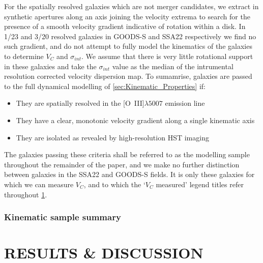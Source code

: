\documentclass[fleqn,usenatbib]{mn2e}
\begin{document}
For the spatially resolved galaxies which are not merger candidates, we extract in synthetic apertures along an axis joining the velocity extrema to search for the presence of a smooth velocity gradient indicative of rotation within a disk.
In 1/23 and 3/20 resolved galaxies in GOODS-S and SSA22 respectively we find no such gradient, and do not attempt to fully model the kinematics of the galaxies to determine $V_{C}$ and $\sigma_{int}$.
We assume that there is very little rotational support in these galaxies and take the $\sigma_{int}$ value as the median of the intrumental resolution corrected velocity dispersion map.
To sumamrise, galaxies are passed to the full dynamical modelling of \cref{sec:Kinematic_Properties} if:
\begin{itemize}
    \item They are spatially resolved in the [O~{\sc III}]$\lambda5007$ emission line
    \item They have a clear, monotonic velocity gradient along a single kinematic axis
    \item They are isolated as revealed by high-resolution HST imaging
\end{itemize}

The galaxies passing these criteria shall be referred to as the modelling sample throughout the remainder of the paper, and we make no further distinction between galaxies in the SSA22 and GOODS-S fields.
It is only these galaxies for which we can measure $V_{C}$, and to which the `$V_{C}$ measured' legend titles refer throughout \ref{sec:results}.

\subsubsection{Kinematic sample summary}\label{subsubsec:kin_sample_summary}



\section{RESULTS \& DISCUSSION}\label{sec:results}
\end{document}
